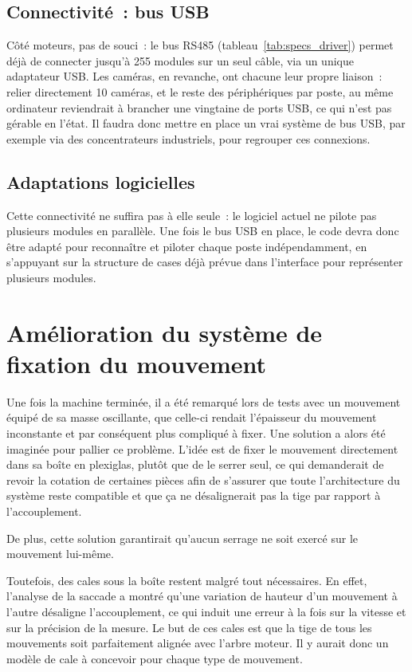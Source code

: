 \subsection{Connectivité~: bus USB}

Côté moteurs, pas de souci~: le bus RS485 (tableau~\ref{tab:specs_driver})
permet déjà de connecter jusqu'à 255 modules sur un seul câble, via un
unique adaptateur USB. Les caméras, en revanche, ont chacune leur propre
liaison~: relier directement 10 caméras, et le reste des périphériques par
poste, au même ordinateur reviendrait à brancher une vingtaine de ports USB,
ce qui n'est pas gérable en l'état. Il faudra donc mettre en place un vrai
système de bus USB, par exemple via des concentrateurs industriels, pour
regrouper ces connexions.

\subsection{Adaptations logicielles}

Cette connectivité ne suffira pas à elle seule~: le logiciel actuel ne
pilote pas plusieurs modules en parallèle. Une fois le bus USB en place, le
code devra donc être adapté pour reconnaître et piloter chaque poste
indépendamment, en s'appuyant sur la structure de cases déjà prévue dans
l'interface pour représenter plusieurs modules.

\section{Amélioration du système de fixation du mouvement}

Une fois la machine terminée, il a été remarqué lors de tests avec un mouvement équipé de sa masse oscillante, que celle-ci
rendait l'épaisseur du mouvement inconstante et par conséquent plus compliqué à fixer.
Une solution a alors été imaginée pour pallier ce problème. L'idée est de fixer le mouvement
directement dans sa boîte en plexiglas, plutôt que de le serrer seul,
ce qui demanderait de revoir la cotation de certaines pièces afin de s'assurer que toute l'architecture du système reste compatible et que ça ne désalignerait pas la tige par rapport à l'accouplement.

De plus, cette solution garantirait qu'aucun serrage ne soit exercé sur le mouvement
lui-même.

Toutefois, des cales sous la boîte restent malgré tout nécessaires. En effet, l'analyse de la
saccade a montré qu'une variation de hauteur d'un mouvement à l'autre
désaligne l'accouplement, ce qui induit une erreur à la fois sur la
vitesse et sur la précision de la mesure. Le but de ces cales est que la tige de tous les mouvements soit parfaitement alignée avec l'arbre moteur. Il y aurait donc un modèle de cale à concevoir pour chaque type de mouvement.

